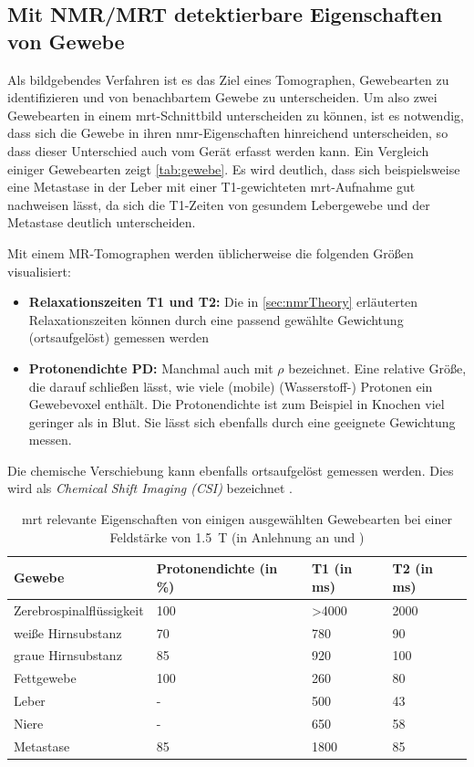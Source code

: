 \subsection{Mit NMR/MRT detektierbare Eigenschaften von Gewebe}
Als bildgebendes Verfahren ist es das Ziel eines Tomographen, Gewebearten zu identifizieren und von benachbartem Gewebe zu unterscheiden. Um also zwei Gewebearten in einem \gls{mrt}-Schnittbild unterscheiden zu können, ist es notwendig, dass sich die Gewebe in ihren \gls{nmr}-Eigenschaften hinreichend unterscheiden, so dass dieser Unterschied auch vom Gerät erfasst werden kann. Ein Vergleich einiger Gewebearten zeigt \autoref{tab:gewebe}. Es wird deutlich, dass sich beispielsweise eine Metastase in der Leber mit einer T1-gewichteten \gls{mrt}-Aufnahme gut nachweisen lässt, da sich die T1-Zeiten von gesundem Lebergewebe und der Metastase deutlich unterscheiden.

Mit einem MR-Tomographen werden üblicherweise die folgenden Größen visualisiert:
\begin{itemize}
	\item \textbf{Relaxationszeiten T1 und T2:} Die in \autoref{sec:nmrTheory} erläuterten Relaxationszeiten können durch eine passend gewählte Gewichtung (ortsaufgelöst) gemessen werden
	\item \textbf{Protonendichte PD:} Manchmal auch mit \textbf{$\rho$} bezeichnet. Eine relative Größe, die darauf schließen lässt, wie viele (mobile) (Wasserstoff-) Protonen ein Gewebevoxel enthält. Die Protonendichte ist zum Beispiel in Knochen viel geringer als in Blut. Sie lässt sich ebenfalls durch eine geeignete Gewichtung messen.  
\end{itemize}

Die chemische Verschiebung kann ebenfalls ortsaufgelöst gemessen werden. Dies wird als \textit{Chemical Shift Imaging (CSI)} bezeichnet \cite{Keevil2006}.

\begin{table}[H]
	\centering
	\caption[MRT relevante Eigenschaften ausgewählter Gewebe]{\gls{mrt} relevante Eigenschaften von einigen ausgewählten Gewebearten bei einer Feldstärke von \SI{1.5}{\tesla} (in Anlehnung an \cite[S.~16]{Weishaupt2014} und \cite[S.~17]{Reiser2008})}
	\label{tab:gewebe}
	\begin{tabular}{llll}
		\toprule
		\textbf{Gewebe} & \textbf{Protonendichte (in \%)} & \textbf{T1 (in ms)} & \textbf{T2 (in ms)} \\
		\midrule
		Zerebrospinalflüssigkeit & 100 & \textgreater4000 & 2000 \\
		weiße Hirnsubstanz & 70 & 780 & 90 \\
		graue Hirnsubstanz & 85 & 920 & 100 \\
		Fettgewebe & 100 & 260 & 80 \\
		Leber & - & 500 & 43 \\
		Niere & - & 650 & 58 \\
		Metastase & 85 & 1800 & 85 \\
		\bottomrule
	\end{tabular}
\end{table}

